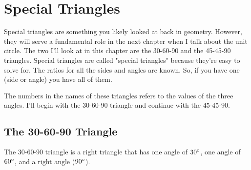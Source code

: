 \clearpage
\chapter{Special Triangles}
Special triangles are something you likely looked at back in geometry. However, they will serve a fundamental role in the next chapter when I talk about the unit circle. The two I'll look at in this chapter are the 30-60-90 and the 45-45-90 triangles. Special triangles are called "special triangles" because they're easy to solve for. The ratios for all the sides and angles are known. So, if you have one (side or angle) you have all of them.

The numbers in the names of these triangles refers to the values of the three angles. I'll begin with the 30-60-90 triangle and continue with the 45-45-90.
\section{The 30-60-90 Triangle}
The 30-60-90 triangle is a right triangle that has one angle of $30\degree$, one angle of $60\degree$, and a right angle ($90\degree$).
